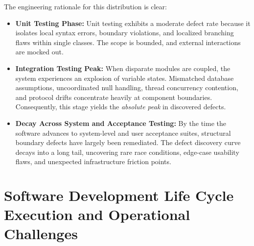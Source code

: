 \documentclass[11pt,a4paper]{article}
\begin{document}
The engineering rationale for this distribution is clear:
\begin{itemize}
    \item \textbf{Unit Testing Phase:} Unit testing exhibits a moderate defect rate because it isolates local syntax errors, boundary violations, and localized branching flaws within single classes. The scope is bounded, and external interactions are mocked out.
    \item \textbf{Integration Testing Peak:} When disparate modules are coupled, the system experiences an explosion of variable states. Mismatched database assumptions, uncoordinated null handling, thread concurrency contention, and protocol drifts concentrate heavily at component boundaries. Consequently, this stage yields the \textit{absolute peak} in discovered defects.
    \item \textbf{Decay Across System and Acceptance Testing:} By the time the software advances to system-level and user acceptance suites, structural boundary defects have largely been remediated. The defect discovery curve decays into a long tail, uncovering rare race conditions, edge-case usability flaws, and unexpected infrastructure friction points.
\end{itemize}

\section[SDLC Execution and Challenges]{Software Development Life Cycle Execution and Operational Challenges}
\label{sec:sdlc_execution}
\end{document}
